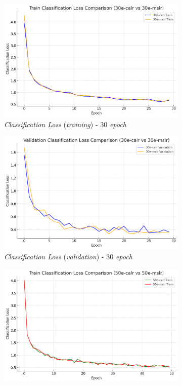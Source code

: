 \begin{figure}[htbp]
  \centering
  \begin{subfigure}{0.45\textwidth}
    \includegraphics[width=\textwidth]{gambar/bab4-train-clsloss-30e.png}
    \caption{\emph{Classification Loss} (\emph{training}) - 30 \emph{epoch}}
  \end{subfigure}
  \hfill
  \begin{subfigure}{0.45\textwidth}
    \includegraphics[width=\textwidth]{gambar/bab4-val-clsloss-30e.png}
    \caption{\emph{Classification Loss} (\emph{validation}) - 30 \emph{epoch}}
  \end{subfigure}
  \hfill
  \begin{subfigure}{0.45\textwidth}
    \includegraphics[width=\textwidth]{gambar/bab4-train-clsloss-50e.png}

\end{subfigure}
\end{figure}
